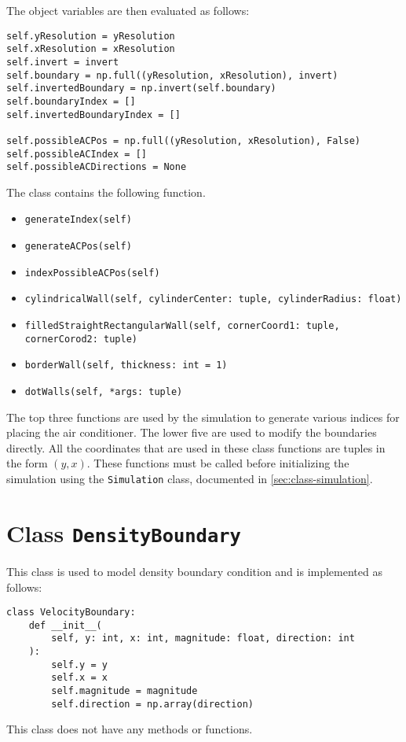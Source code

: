 The object variables are then evaluated as follows:
\begin{verbatim}
self.yResolution = yResolution
self.xResolution = xResolution
self.invert = invert
self.boundary = np.full((yResolution, xResolution), invert)
self.invertedBoundary = np.invert(self.boundary)
self.boundaryIndex = []
self.invertedBoundaryIndex = []

self.possibleACPos = np.full((yResolution, xResolution), False)
self.possibleACIndex = []
self.possibleACDirections = None
\end{verbatim}
The class contains the following function.
\begin{itemize}[noitemsep]
	\item \texttt{generateIndex(self)}
	\item \texttt{generateACPos(self)}
	\item \texttt{indexPossibleACPos(self)}
	\item \texttt{cylindricalWall(self, cylinderCenter: tuple, cylinderRadius: float)}
	\item \texttt{filledStraightRectangularWall(self, cornerCoord1: tuple, cornerCorod2: tuple)}
	\item \texttt{borderWall(self, thickness: int = 1)}
	\item \texttt{dotWalls(self, *args: tuple)}
\end{itemize}
The top three functions are used by the simulation to generate various indices for placing the air conditioner. The lower five are used to modify the boundaries directly. All the coordinates that are used in these class functions are tuples in the form $(y, x)$. These functions must be called before initializing the simulation using the \texttt{Simulation} class, documented in \cref{sec:class-simulation}.

\section[Class: density boundary condition]{Class \texttt{DensityBoundary}}

This class is used to model density boundary condition and is implemented as follows:
\begin{verbatim}
class VelocityBoundary:
    def __init__(
        self, y: int, x: int, magnitude: float, direction: int
    ):
        self.y = y
        self.x = x
        self.magnitude = magnitude
        self.direction = np.array(direction)
\end{verbatim}
This class does not have any methods or functions.

